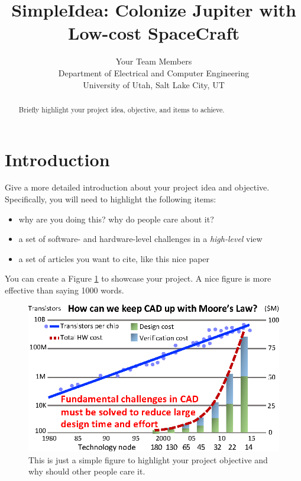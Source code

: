 \documentclass[conference, final]{IEEEtran}
\begin{document}
\title{SimpleIdea: Colonize Jupiter with Low-cost SpaceCraft}

\author{
    Your Team Members\\
    Department of Electrical and Computer Engineering\\
    University of Utah, Salt Lake City, UT\\
}

\date{}
\maketitle

\thispagestyle{empty}

\begin{abstract}
Briefly highlight your project idea, objective, and items to achieve.
\end{abstract}

\section{Introduction}

Give a more detailed introduction about your project idea and objective.
Specifically, you will need to highlight the following items:

\begin{itemize}

\item why are you doing this? why do people care about it?
\item a set of software- and hardware-level challenges in a \textit{high-level} view
\item a set of articles you want to cite, like this nice paper~\cite{nicepaper1}

\end{itemize}

You can create a Figure \ref{fig::intro} to showcase your project.
A nice figure is more effective than saying 1000 words.

\begin{figure}[h]
  \centering
  \centerline{\includegraphics[width=1.\columnwidth]{Fig/intro.eps}}
  \caption{This is just a simple figure to highlight your project objective and why 
  should other people care it.}
  \label{fig::intro}
\end{figure}
\end{document}
